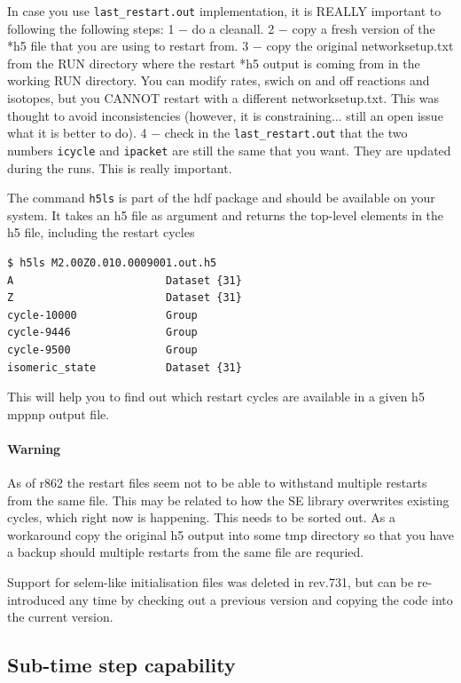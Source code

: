 In case you use \texttt{last\_restart.out} implementation, it is REALLY 
important to following the following steps: 1 $-$ do a cleanall. 
2 $-$ copy a fresh version of the *h5 file that you are using 
to restart from. 3 $-$ copy the original networksetup.txt 
from the RUN directory where the restart *h5 output is coming from in
the working RUN directory.  You can modify rates, swich on and off 
reactions and isotopes, but you CANNOT restart with a different 
networksetup.txt.  This was thought to avoid inconsistencies
(however, it is constraining... still an open issue what it is better to do).
4 $-$ check in the \texttt{last\_restart.out} that
the two numbers \texttt{icycle} and \texttt{ipacket} are still the same that
you want. They are updated during the runs.
This is really important.

The command \texttt{h5ls} is part of the hdf package and should be available on your system. It takes an h5 file as argument and returns the top-level elements in the h5 file, including the restart cycles
\begin{verbatim}
$ h5ls M2.00Z0.010.0009001.out.h5 
A                        Dataset {31}
Z                        Dataset {31}
cycle-10000              Group
cycle-9446               Group
cycle-9500               Group
isomeric_state           Dataset {31}

\end{verbatim}
This will help you to find out which restart cycles are available in a given h5 mppnp output file.

\paragraph{Warning} As of r862 the restart files seem not to be able to withstand multiple restarts from the same file. This may be related to how the SE library overwrites existing cycles, which right now is happening. This needs to be sorted out. As a workaround copy the original h5 output into some tmp directory so that you have a backup should multiple restarts from the same file are requried. 


Support for selem-like initialisation files was deleted in rev.731,
but can be re-introduced any time by checking out a previous version
and copying the code into the current version.
 
\subsection{Sub-time step capability} 
 
